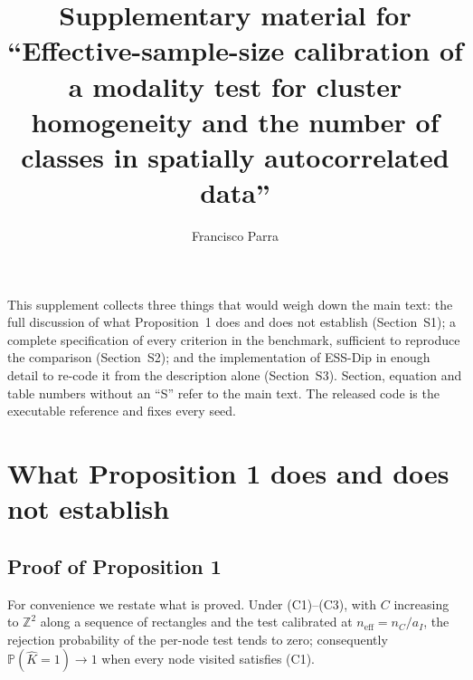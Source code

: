 \documentclass[11pt]{article}
\title{Supplementary material for\\
``Effective-sample-size calibration of a modality test for cluster
homogeneity and the number of classes in spatially autocorrelated data''}
\author{Francisco Parra}
\date{}
\newcommand{\Z}{\mathbb{Z}}
\newcommand{\Prob}{\mathbb{P}}
\newcommand{\neff}{n_{\mathrm{eff}}}
\begin{document}
\maketitle

\noindent
This supplement collects three things that would weigh down the main text: the
full discussion of what Proposition~1 does and does not establish (Section~S1);
a complete specification of every criterion in the benchmark, sufficient to
reproduce the comparison (Section~S2); and the implementation of ESS-Dip in
enough detail to re-code it from the description alone (Section~S3). Section,
equation and table numbers without an ``S'' refer to the main text. The
released code is the executable reference and fixes every seed.

\section{What Proposition 1 does and does not establish}\label{sec:supp-prop}

\subsection*{Proof of Proposition 1}

For convenience we restate what is proved. Under (C1)--(C3), with $C$
increasing to $\Z^{2}$ along a sequence of rectangles and the test calibrated
at $\neff=n_C/a_I$, the rejection probability of the per-node test tends to
zero; consequently $\Prob(\hat K=1)\to1$ when
every node visited satisfies (C1).
\end{document}
